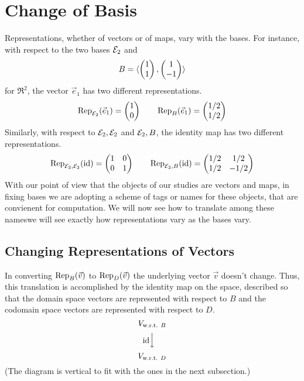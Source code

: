 \section{Change of Basis}
Representations, whether of vectors or of maps, vary with the bases.
For instance, with respect to the two bases $\stdbasis_2$ and 
\begin{equation*}
  B=\sequence{\colvec{1 \\ 1},\colvec{1 \\ -1}}
\end{equation*}
for $\Re^2$, the vector 
$\vec{e}_1$ has two different representations.
\begin{equation*}
  \rep{\vec{e}_1}{\stdbasis_2}=\colvec{1 \\ 0}
  \qquad
  \rep{\vec{e}_1}{B}=\colvec{1/2 \\ 1/2}
\end{equation*}
Similarly, with respect to $\stdbasis_2,\stdbasis_2$ and $\stdbasis_2,B$, the identity map
has two different representations.
\begin{equation*}
  \rep{\text{id}}{\stdbasis_2,\stdbasis_2}=
   \begin{pmatrix}
     1  &0  \\
     0  &1
   \end{pmatrix}
   \qquad
  \rep{\text{id}}{\stdbasis_2,B}=
   \begin{pmatrix}
     1/2  &1/2  \\
     1/2  &-1/2
   \end{pmatrix}
\end{equation*}
With our point of view that the objects of our studies are vectors and
maps, in fixing bases 
we are adopting a scheme of tags or names for these objects, that are
convienent for computation.
We will now see how to translate among these names\Dash we will
see exactly how representations vary as the bases vary.












\subsection{Changing Representations of Vectors}
In converting 
$\rep{\vec{v}}{B}$ to $\rep{\vec{v}}{D}$
the underlying vector $\vec{v}$ doesn't change.
Thus,  
this translation is accomplished by the identity map on the space,
described so that
the domain space vectors are represented with respect to $B$ and
the codomain space vectors are represented with respect to $D$. 
\begin{equation*}
  \begin{CD}
    V_\wrt{B}                      \\
    @V\scriptstyle\identity VV   \\
    V_\wrt{D}
  \end{CD}
\end{equation*}
(The diagram is
vertical to fit with the ones in the next subsection.)

